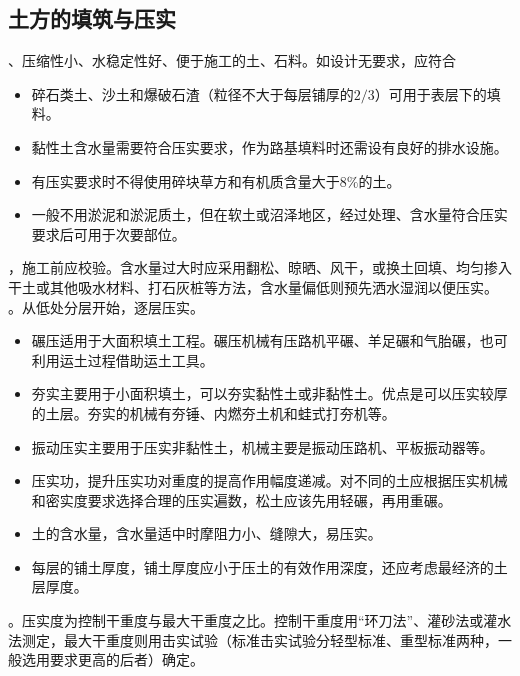 \documentclass{book}
\begin{document}
\subsection{土方的填筑与压实}
、压缩性小、水稳定性好、便于施工的土、石料。如设计无要求，应符合
\begin{itemize}
    \item 碎石类土、沙土和爆破石渣（粒径不大于每层铺厚的$2/3$）可用于表层下的填料。
    \item 黏性土含水量需要符合压实要求，作为路基填料时还需设有良好的排水设施。
    \item 有压实要求时不得使用碎块草方和有机质含量大于$8\%$的土。
    \item 一般不用淤泥和淤泥质土，但在软土或沼泽地区，经过处理、含水量符合压实要求后可用于次要部位。
\end{itemize}
，施工前应校验。含水量过大时应采用翻松、晾晒、风干，或换土回填、均匀掺入干土或其他吸水材料、打石灰桩等方法，含水量偏低则预先洒水湿润以便压实。
。从低处分层开始，逐层压实。
\begin{itemize}
    \item 碾压适用于大面积填土工程。碾压机械有压路机平碾、羊足碾和气胎碾，也可利用运土过程借助运土工具。
    \item 夯实主要用于小面积填土，可以夯实黏性土或非黏性土。优点是可以压实较厚的土层。夯实的机械有夯锤、内燃夯土机和蛙式打夯机等。
    \item 振动压实主要用于压实非黏性土，机械主要是振动压路机、平板振动器等。
\end{itemize}
\begin{itemize}
    \item 压实功，提升压实功对重度的提高作用幅度递减。对不同的土应根据压实机械和密实度要求选择合理的压实遍数，松土应该先用轻碾，再用重碾。
    \item 土的含水量，含水量适中时摩阻力小、缝隙大，易压实。
    \item 每层的铺土厚度，铺土厚度应小于压土的有效作用深度，还应考虑最经济的土层厚度。
\end{itemize}
。压实度为控制干重度与最大干重度之比。控制干重度用“环刀法”、灌砂法或灌水法测定，最大干重度则用击实试验（标准击实试验分轻型标准、重型标准两种，一般选用要求更高的后者）确定。
\end{document}
